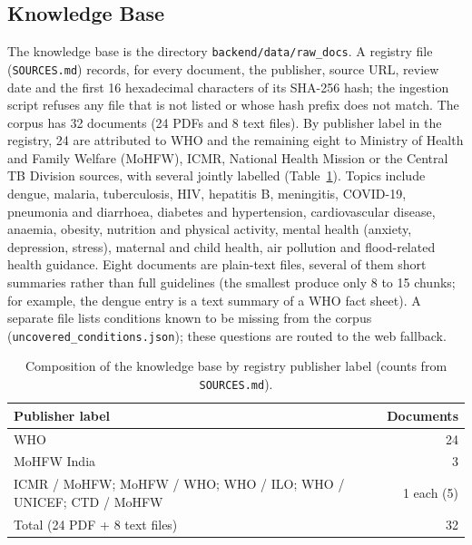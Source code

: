 \documentclass[10pt,a4paper]{article}
\newcommand{\code}[1]{\texttt{\small #1}}
\begin{document}
\subsection{Knowledge Base}
The knowledge base is the directory \code{backend/data/raw\_docs}. A registry file (\code{SOURCES.md}) records, for every document, the publisher, source URL, review date and the first 16 hexadecimal characters of its SHA-256 hash; the ingestion script refuses any file that is not listed or whose hash prefix does not match. The corpus has 32 documents (24 PDFs and 8 text files). By publisher label in the registry, 24 are attributed to WHO and the remaining eight to Ministry of Health and Family Welfare (MoHFW), ICMR, National Health Mission or the Central TB Division sources, with several jointly labelled (Table~\ref{tab:corpus}). Topics include dengue, malaria, tuberculosis, HIV, hepatitis B, meningitis, COVID-19, pneumonia and diarrhoea, diabetes and hypertension, cardiovascular disease, anaemia, obesity, nutrition and physical activity, mental health (anxiety, depression, stress), maternal and child health, air pollution and flood-related health guidance. Eight documents are plain-text files, several of them short summaries rather than full guidelines (the smallest produce only 8 to 15 chunks; for example, the dengue entry is a text summary of a WHO fact sheet). A separate file lists conditions known to be missing from the corpus (\code{uncovered\_conditions.json}); these questions are routed to the web fallback.

\begin{table}[t]
\centering\small
\caption{Composition of the knowledge base by registry publisher label (counts from \code{SOURCES.md}).}
\label{tab:corpus}
\begin{tabular}{lr}
\toprule
Publisher label & Documents\\
\midrule
WHO & 24\\
MoHFW India & 3\\
ICMR / MoHFW; MoHFW / WHO; WHO / ILO; WHO / UNICEF; CTD / MoHFW & 1 each (5)\\
\midrule
Total (24 PDF + 8 text files) & 32\\
\bottomrule
\end{tabular}
\end{table}
\end{document}
